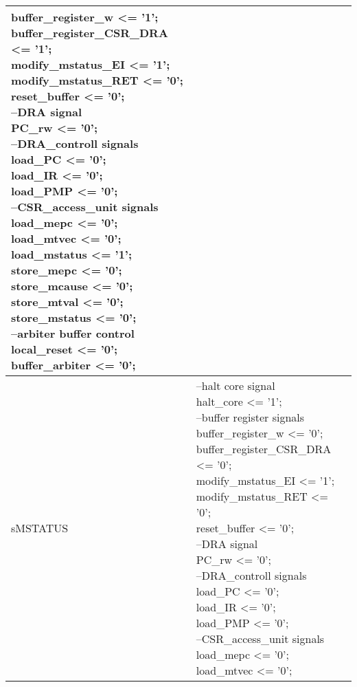 \begin{small}
\begin{longtable}{| p{} | p{} |}
{		buffer\_register\_w <= '1';\\
		buffer\_register\_CSR\_DRA <= '1';\\
		modify\_mstatus\_EI <= '1';\\
		modify\_mstatus\_RET <= '0';\\
		reset\_buffer <= '0';\\
		--DRA signal\\
		PC\_rw <= '0';\\
		--DRA\_controll signals\\
		load\_PC <= '0';\\
		load\_IR <= '0';\\
		load\_PMP <= '0';\\
		--CSR\_access\_unit signals\\
		load\_mepc <= '0';\\
		load\_mtvec <= '0';\\
		load\_mstatus <= '1';\\
		store\_mepc <= '0';\\
		store\_mcause <= '0';\\
		store\_mtval <= '0';\\
		store\_mstatus <= '0';\\
		--arbiter buffer control\\
		local\_reset <= '0';\\
		buffer\_arbiter <= '0';} \\
	\hline
	sMSTATUS & \makecell{--halt core signal\\
		halt\_core <= '1';\\
		--buffer register signals\\
		buffer\_register\_w <= '0';\\
		buffer\_register\_CSR\_DRA <= '0';\\
		modify\_mstatus\_EI <= '1';\\
		modify\_mstatus\_RET <= '0';\\
		reset\_buffer <= '0';\\
		--DRA signal\\
		PC\_rw <= '0';\\
		--DRA\_controll signals\\
		load\_PC <= '0';\\
		load\_IR <= '0';\\
		load\_PMP <= '0';\\
		--CSR\_access\_unit signals\\
		load\_mepc <= '0';\\
		load\_mtvec <= '0';\\
}
\end{longtable}
\end{small}
